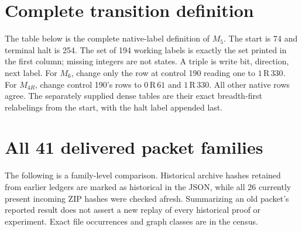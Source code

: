 \documentclass[10pt,letterpaper]{article}
\newcommand{\act}[3]{#1\,\mathrm{#2}\,#3}
\begin{document}
\appendix
\clearpage
\section{Complete transition definition}
\label{app:table}

The table below is the complete native-label definition of $M_5$. The start is 74 and terminal halt is 254. The set of 194 working labels is exactly the set printed in the first column; missing integers are not states. A triple is write bit, direction, next label. For $M_6$, change only the row at control 190 reading one to $\act{1}{R}{330}$. For $M_{4R}$, change control 190's rows to $\act{0}{R}{61}$ and $\act{1}{R}{330}$. All other native rows agree. The separately supplied dense tables are their exact breadth-first relabelings from the start, with the halt label appended last.



\clearpage
\section{All 41 delivered packet families}
\label{app:ledger}
The following is a family-level comparison. Historical archive hashes retained from earlier ledgers are marked as historical in the JSON, while all 26 currently present incoming ZIP hashes were checked afresh. Summarizing an old packet's reported result does not assert a new replay of every historical proof or experiment. Exact file occurrences and graph classes are in the census.

\end{document}
